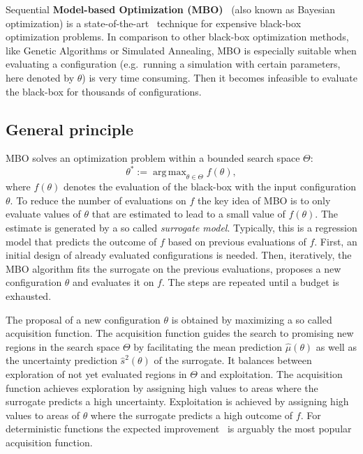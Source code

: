 \documentclass[bimj,fleqn]{w-art}
\theoremstyle{plain}
\theoremstyle{definition}
\begin{document}
Sequential \textbf{Model-based Optimization (MBO)}~\citep{jones_taxonomy_2001} (also known as Bayesian optimization) is a state-of-the-art~\citep{shahriari_taking_2016} technique for expensive black-box optimization problems.
In comparison to other black-box optimization methods, like Genetic Algorithms or Simulated Annealing, MBO is especially suitable when evaluating a configuration (e.g.\ running a simulation with certain parameters, here denoted by $\theta$) is very time consuming.
Then it becomes infeasible to evaluate the black-box for thousands of configurations.

\subsection{General principle}
MBO solves an optimization problem within a bounded search space $\Theta$:
\[
\theta^\ast := \operatorname{arg\,max}_{\theta \in \Theta} f(\theta),
\]
where $f(\theta)$ denotes the evaluation of the black-box with the input configuration $\theta$.
To reduce the number of evaluations on $f$ the key idea of MBO is to only evaluate values of $\theta$ that are estimated to lead to a small value of $f(\theta)$.
The estimate is generated by a so called \emph{surrogate model}.
Typically, this is a regression model that predicts the outcome of $f$ based on previous evaluations of $f$.
First, an initial design of already evaluated configurations is needed.
Then, iteratively, the MBO algorithm fits the surrogate on the previous evaluations, proposes a new configuration $\theta$ and evaluates it on $f$.
The steps are repeated until a budget is exhausted.

The proposal of a new configuration $\theta$ is obtained by maximizing a so called acquisition function.
The acquisition function guides the search to promising new regions in the search space $\Theta$ by facilitating the mean prediction $\hat{\mu}(\theta)$ as well as the uncertainty prediction $\hat{s}^2(\theta)$ of the surrogate.
It balances between exploration of not yet evaluated regions in $\Theta$ and exploitation.
The acquisition function achieves exploration by assigning high values to areas where the surrogate predicts a high uncertainty.
Exploitation is achieved by assigning high values to areas of $\theta$ where the surrogate predicts a high outcome of $f$.
For deterministic functions the expected improvement~\citep{jones_efficient_1998} is arguably the most popular acquisition function.
\end{document}
